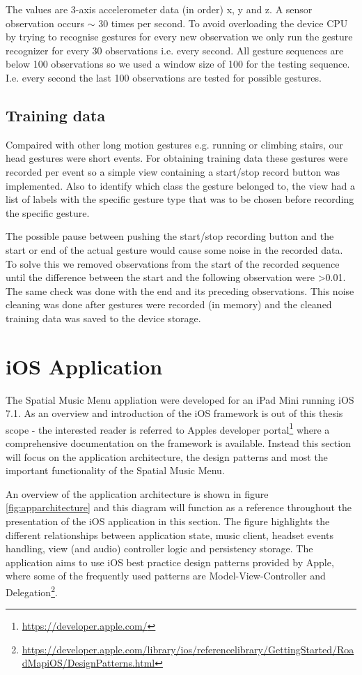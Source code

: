 The values are 3-axis accelerometer data (in order) x, y and z. A sensor observation occurs $\sim$ 30 times per second. To avoid overloading the device CPU by trying to recognise gestures for every new observation we only run the gesture recognizer for every 30 observations i.e. every second. All gesture sequences are below 100 observations so we used a window size of 100 for the testing sequence. I.e. every second the last 100 observations are tested for possible gestures.

\subsection{Training data}
Compaired with other long motion gestures e.g. running or climbing stairs, our head gestures were short events. For obtaining training data these gestures were recorded per event so a simple view containing a start/stop record button was implemented. Also to identify which class the gesture belonged to, the view had a list of labels with the specific gesture type that was to be chosen before recording the specific gesture.

The possible pause between pushing the start/stop recording button and the start or end of the actual gesture would cause some noise in the recorded data. To solve this we removed observations from the start of the recorded sequence until the difference between the start and the following observation were \textgreater 0.01. The same check was done with the end and its preceding observations. This noise cleaning was done after gestures were recorded (in memory) and the cleaned training data was saved to the device storage.


\section{iOS Application}
The Spatial Music Menu appliation were developed for an iPad Mini running iOS 7.1. As an overview and introduction of the iOS framework is out of this thesis scope - the interested reader is referred to Apples developer portal\footnote{\url{https://developer.apple.com/}} where a comprehensive documentation on the framework is available. Instead this section will focus on the application architecture, the design patterns and most the important functionality of the Spatial Music Menu.

An overview of the application architecture is shown in figure \ref{fig:apparchitecture} and this diagram will function as a reference throughout the presentation of the iOS application in this section. The figure highlights the different relationships between application state, music client, headset events handling, view (and audio) controller logic and persistency storage. The application aims to use iOS best practice design patterns provided by Apple, where some of the frequently used patterns are Model-View-Controller and Delegation\footnote{\url{https://developer.apple.com/library/ios/referencelibrary/GettingStarted/RoadMapiOS/DesignPatterns.html}}.

